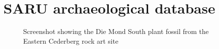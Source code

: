 \section[SARU archaeological database]{SARU archaeological database}
\label{sec:case-studies:saru-archaeological-database}

\begin{figure}
  \centering
\caption[Screenshot showing a sample rock art from SARU collection]{Screenshot showing the Die Mond South plant fossil from the Eastern Cederberg rock art site}
\label{fig:case-studies:saru-archaeological-database:legacy-database-migration:die-mond-south-plant-fossil}
\end{figure}

%
%
%

